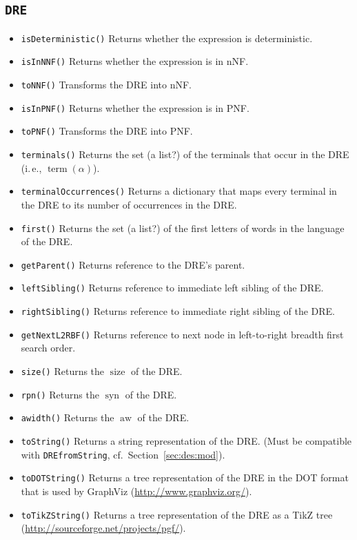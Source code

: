 \documentclass[a4paper,11pt, svgnames,titlepage]{article}
\DeclareMathOperator{\siz}{size}
\DeclareMathOperator{\syn}{syn}
\DeclareMathOperator{\aw}{aw}
\DeclareMathOperator{\term}{term}
\begin{document}
\subsection{\texttt{DRE}}\label{sec:des:dre}
\begin{itemize}
	\item\texttt{isDeterministic()} Returns whether the expression is deterministic.
	\item\texttt{isInNNF()} Returns whether the expression is in nNF.
	\item\texttt{toNNF()} Transforms the DRE into nNF.
	\item\texttt{isInPNF()} Returns whether the expression is in PNF.
	\item\texttt{toPNF()} Transforms the DRE into PNF.
	\item\texttt{terminals()} Returns the set (a list?) of the terminals that occur in the DRE (i.\,e., $\term(\alpha)$).
	\item\texttt{terminalOccurrences()} Returns a dictionary that maps every terminal in the DRE to its number of occurrences in the DRE.
	\item\texttt{first()} Returns the set (a list?) of the first letters of words in the language of the DRE.
	\item\texttt{getParent()} Returns reference to the DRE's parent.
	\item\texttt{leftSibling()} Returns reference to immediate left sibling of the DRE.
	\item\texttt{rightSibling()} Returns reference to immediate right sibling of the DRE.
	\item\texttt{getNextL2RBF()} Returns reference to next node in left-to-right breadth first search order.
	\item\texttt{size()} Returns the $\siz$ of the DRE.
	\item\texttt{rpn()} Returns the $\syn$ of the DRE.
	\item\texttt{awidth()} Returns the $\aw$ of the DRE.
	\item\texttt{toString()} Returns a string representation of the DRE. (Must be compatible with \texttt{DREfromString}, cf.\ Section~\ref{sec:des:mod}).
	\item\texttt{toDOTString()} Returns a tree representation of the DRE in the DOT format that is used by GraphViz (\url{http://www.graphviz.org/}).
	\item\texttt{toTikZString()} Returns a tree representation of the DRE as a TikZ tree (\url{http://sourceforge.net/projects/pgf/}).
\end{itemize}
\end{document}
